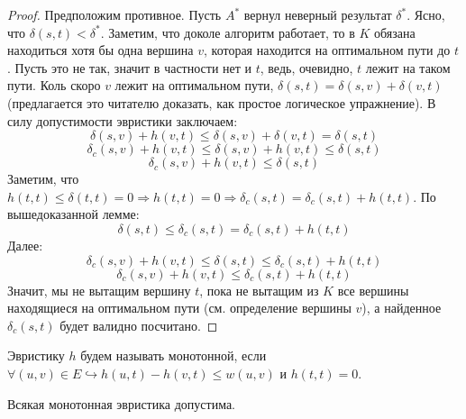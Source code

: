 \begin{proof}
    Предположим противное. Пусть $A^*$ вернул неверный результат $\delta^*$. Ясно, что $\delta(s, t) < \delta^*$.
    Заметим, что доколе алгоритм работает, то в $K$ обязана находиться хотя бы одна вершина $v$, которая находится на оптимальном пути до $t$. Пусть это не так, значит в частности нет и $t$, ведь, очевидно, $t$ лежит на таком пути. Коль скоро $v$ лежит на оптимальном пути, $\delta(s, t) = \delta(s, v) + \delta(v, t)$ (предлагается это читателю доказать, как простое логическое упражнение). В силу допустимости эвристики заключаем:
    \begin{equation*}
        \delta(s, v) + h(v, t) \leq \delta(s, v) + \delta(v, t) = \delta(s, t)
    \end{equation*}
    \begin{equation*}
        \delta_c(s, v) + h(v, t) \leq \delta(s, v) + h(v, t) \leq \delta(s, t)
    \end{equation*}
    \begin{equation*}
        \delta_c(s, v) + h(v, t) \leq \delta(s, t)
    \end{equation*}
    Заметим, что $h(t, t) \leq \delta(t, t) = 0 \Rightarrow h(t, t) = 0 \Rightarrow \delta_c(s, t) = \delta_c(s, t) + h(t, t)$. По вышедоказанной лемме:
    \begin{equation*}
        \delta(s, t) \leq \delta_c(s, t) = \delta_c(s, t) + h(t, t)
    \end{equation*}
    Далее:
    \begin{equation*}
        \delta_c(s, v) + h(v, t) \leq \delta(s, t) \leq \delta_c(s, t) + h(t, t)
    \end{equation*}
    \begin{equation*}
        \delta_c(s, v) + h(v, t) \leq \delta_c(s, t) + h(t, t)
    \end{equation*}
    Значит, мы не вытащим вершину $t$, пока не вытащим из $K$ все вершины находящиеся на оптимальном пути (см. определение вершины $v$), а найденное $\delta_c(s, t)$ будет валидно посчитано.
\end{proof}

\Def Эвристику $h$ будем называть монотонной, если $\forall (u, v) \in E \hookrightarrow h(u, t) - h(v, t) \leq w(u, v)$ и $h(t, t) = 0$.

\St Всякая монотонная эвристика допустима.

